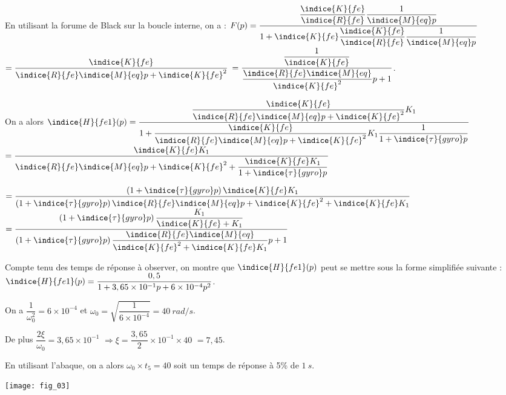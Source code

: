 \ifprof
\begin{corrige}
En utilisant la forume de Black sur la boucle interne, on a : $F(p)=\dfrac{\dfrac{\indice{K}{fe}}{\indice{R}{fe}}\dfrac{1}{\indice{M}{eq}p}}{1+\indice{K}{fe}\dfrac{\indice{K}{fe}}{\indice{R}{fe}}\dfrac{1}{\indice{M}{eq}p}}$
$=\dfrac{\indice{K}{fe}}{\indice{R}{fe}\indice{M}{eq}p+\indice{K}{fe}^2}$
$=\dfrac{\dfrac{1}{\indice{K}{fe}}}{\dfrac{\indice{R}{fe}\indice{M}{eq}}{\indice{K}{fe}^2}p+1}$.

On a alors 
$\indice{H}{fe1}(p)=\dfrac{\dfrac{\indice{K}{fe}}{\indice{R}{fe}\indice{M}{eq}p+\indice{K}{fe}^2}K_1}{1+\dfrac{\indice{K}{fe}}{\indice{R}{fe}\indice{M}{eq}p+\indice{K}{fe}^2}K_1\dfrac{1}{1+\indice{\tau}{gyro}p}}$
$=\dfrac{\indice{K}{fe}K_1}{\indice{R}{fe}\indice{M}{eq}p+\indice{K}{fe}^2+\dfrac{\indice{K}{fe} K_1}{1+\indice{\tau}{gyro}p}}$

$=\dfrac{\left(1+\indice{\tau}{gyro}p\right)\indice{K}{fe}K_1}{\left(1+\indice{\tau}{gyro}p\right)\indice{R}{fe}\indice{M}{eq}p+\indice{K}{fe}^2+\indice{K}{fe} K_1}$
$=\dfrac{\left(1+\indice{\tau}{gyro}p\right)\dfrac{K_1}{\indice{K}{fe}+ K_1}}{\left(1+\indice{\tau}{gyro}p\right)\dfrac{\indice{R}{fe}\indice{M}{eq}}{\indice{K}{fe}^2+\indice{K}{fe} K_1}p+1}$




\end{corrige}
\else
\fi
Compte tenu des temps de réponse à observer, on montre que $\indice{H}{fe1}(p)$ peut se mettre sous la forme simplifiée suivante : $\indice{H}{fe1}(p)=\dfrac{0,5}{1+3,65\times 10^{-1}p+6\times 10^{-4}p^2}$.
\ifprof
\begin{corrige}
On a $\dfrac{1}{\omega_0^2}=6 \times 10^{-4}$ et $\omega_0 = \sqrt{\dfrac{1}{6 \times 10^{-4}}} = \SI{40}{rad/s}$.

De plus $\dfrac{2\xi}{\omega_0} = 3,65\times 10^{-1}$ $\Rightarrow  \xi =  \dfrac{3,65}{2}\times 10^{-1}\times 40$ $=7,45$.

En utilisant l'abaque, on a alors $\omega_0 \times t_5 = 40$ soit un temps de réponse à 5\% de $\SI{1}{s}$.
\end{corrige}
\else
\fi


\begin{marginfigure}
\texttt{[image: fig\_03]}
\end{marginfigure}


